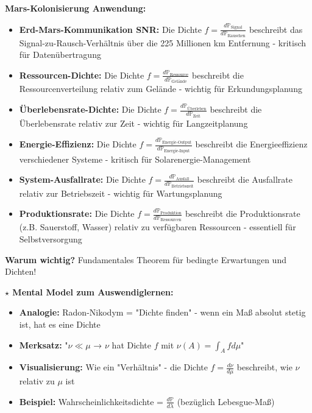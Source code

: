 \begin{denoobification}
\textbf{Mars-Kolonisierung Anwendung:}
\begin{itemize}
    \item \textbf{Erd-Mars-Kommunikation SNR:} Die Dichte $f = \frac{d\mathbb{P}_{\text{Signal}}}{d\mathbb{P}_{\text{Rauschen}}}$ beschreibt das Signal-zu-Rausch-Verhältnis über die 225 Millionen km Entfernung - kritisch für Datenübertragung
    \item \textbf{Ressourcen-Dichte:} Die Dichte $f = \frac{d\mathbb{P}_{\text{Ressource}}}{d\mathbb{P}_{\text{Gelände}}}$ beschreibt die Ressourcenverteilung relativ zum Gelände - wichtig für Erkundungsplanung
    \item \textbf{Überlebensrate-Dichte:} Die Dichte $f = \frac{d\mathbb{P}_{\text{Überleben}}}{d\mathbb{P}_{\text{Zeit}}}$ beschreibt die Überlebensrate relativ zur Zeit - wichtig für Langzeitplanung
    \item \textbf{Energie-Effizienz:} Die Dichte $f = \frac{d\mathbb{P}_{\text{Energie-Output}}}{d\mathbb{P}_{\text{Energie-Input}}}$ beschreibt die Energieeffizienz verschiedener Systeme - kritisch für Solarenergie-Management
    \item \textbf{System-Ausfallrate:} Die Dichte $f = \frac{d\mathbb{P}_{\text{Ausfall}}}{d\mathbb{P}_{\text{Betriebszeit}}}$ beschreibt die Ausfallrate relativ zur Betriebszeit - wichtig für Wartungsplanung
    \item \textbf{Produktionsrate:} Die Dichte $f = \frac{d\mathbb{P}_{\text{Produktion}}}{d\mathbb{P}_{\text{Ressourcen}}}$ beschreibt die Produktionsrate (z.B. Sauerstoff, Wasser) relativ zu verfügbaren Ressourcen - essentiell für Selbstversorgung
\end{itemize}

\textbf{Warum wichtig?} Fundamentales Theorem für bedingte Erwartungen und Dichten!

\textbf{$\star$ Mental Model zum Auswendiglernen:}
\begin{itemize}
    \item \textbf{Analogie:} Radon-Nikodym = "Dichte finden" - wenn ein Maß absolut stetig ist, hat es eine Dichte
    \item \textbf{Merksatz:} "$\nu \ll \mu$ → $\nu$ hat Dichte $f$ mit $\nu(A) = \int_A f d\mu$"
    \item \textbf{Visualisierung:} Wie ein "Verhältnis" - die Dichte $f = \frac{d\nu}{d\mu}$ beschreibt, wie $\nu$ relativ zu $\mu$ ist
    \item \textbf{Beispiel:} Wahrscheinlichkeitsdichte = $\frac{d\mathbb{P}}{d\lambda}$ (bezüglich Lebesgue-Maß)
\end{itemize}


\end{denoobification}
